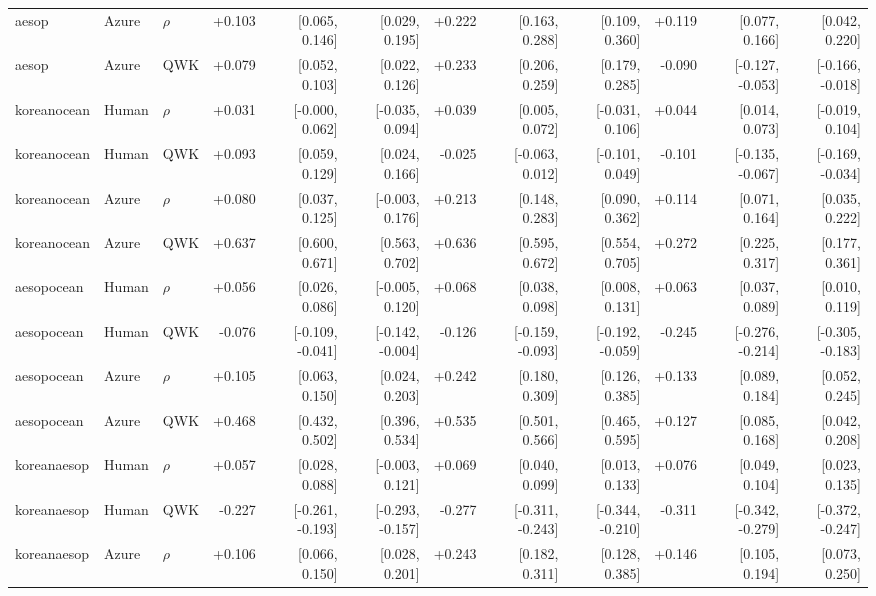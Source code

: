 \documentclass[10pt]{article}
\begin{document}
\begin{landscape}
\begin{longtable}{@{}lllrrrrrrrrr@{}}
aesop & Azure & $\rho$ & +0.103 & [0.065, 0.146] & [0.029, 0.195] & +0.222 & [0.163, 0.288] & [0.109, 0.360] & +0.119 & [0.077, 0.166] & [0.042, 0.220]\\
aesop & Azure & QWK & +0.079 & [0.052, 0.103] & [0.022, 0.126] & +0.233 & [0.206, 0.259] & [0.179, 0.285] & -0.090 & [-0.127, -0.053] & [-0.166, -0.018]\\
\addlinespace[2pt]
koreanocean & Human & $\rho$ & +0.031 & [-0.000, 0.062] & [-0.035, 0.094] & +0.039 & [0.005, 0.072] & [-0.031, 0.106] & +0.044 & [0.014, 0.073] & [-0.019, 0.104]\\
koreanocean & Human & QWK & +0.093 & [0.059, 0.129] & [0.024, 0.166] & -0.025 & [-0.063, 0.012] & [-0.101, 0.049] & -0.101 & [-0.135, -0.067] & [-0.169, -0.034]\\
koreanocean & Azure & $\rho$ & +0.080 & [0.037, 0.125] & [-0.003, 0.176] & +0.213 & [0.148, 0.283] & [0.090, 0.362] & +0.114 & [0.071, 0.164] & [0.035, 0.222]\\
koreanocean & Azure & QWK & +0.637 & [0.600, 0.671] & [0.563, 0.702] & +0.636 & [0.595, 0.672] & [0.554, 0.705] & +0.272 & [0.225, 0.317] & [0.177, 0.361]\\
\addlinespace[2pt]
aesopocean & Human & $\rho$ & +0.056 & [0.026, 0.086] & [-0.005, 0.120] & +0.068 & [0.038, 0.098] & [0.008, 0.131] & +0.063 & [0.037, 0.089] & [0.010, 0.119]\\
aesopocean & Human & QWK & -0.076 & [-0.109, -0.041] & [-0.142, -0.004] & -0.126 & [-0.159, -0.093] & [-0.192, -0.059] & -0.245 & [-0.276, -0.214] & [-0.305, -0.183]\\
aesopocean & Azure & $\rho$ & +0.105 & [0.063, 0.150] & [0.024, 0.203] & +0.242 & [0.180, 0.309] & [0.126, 0.385] & +0.133 & [0.089, 0.184] & [0.052, 0.245]\\
aesopocean & Azure & QWK & +0.468 & [0.432, 0.502] & [0.396, 0.534] & +0.535 & [0.501, 0.566] & [0.465, 0.595] & +0.127 & [0.085, 0.168] & [0.042, 0.208]\\
\addlinespace[2pt]
koreanaesop & Human & $\rho$ & +0.057 & [0.028, 0.088] & [-0.003, 0.121] & +0.069 & [0.040, 0.099] & [0.013, 0.133] & +0.076 & [0.049, 0.104] & [0.023, 0.135]\\
koreanaesop & Human & QWK & -0.227 & [-0.261, -0.193] & [-0.293, -0.157] & -0.277 & [-0.311, -0.243] & [-0.344, -0.210] & -0.311 & [-0.342, -0.279] & [-0.372, -0.247]\\
koreanaesop & Azure & $\rho$ & +0.106 & [0.066, 0.150] & [0.028, 0.201] & +0.243 & [0.182, 0.311] & [0.128, 0.385] & +0.146 & [0.105, 0.194] & [0.073, 0.250]\\

\end{longtable}
\end{landscape}
\end{document}
